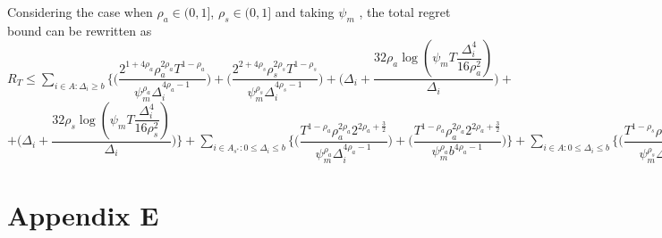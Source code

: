 \begin{remark}
\label{App:D:Rem:1}
Considering the case when $\rho_{a}\in (0,1]$, $\rho_{s}\in (0,1]$ and taking $\psi_{m}$ , the total regret bound can be rewritten as
\newline $R_{T}\leq \sum_{i\in A:\Delta_{i}\geq b} \bigg\lbrace \bigg(\dfrac{2^{1+4\rho_{a}}\rho_{a}^{2\rho_{a}}T^{1-\rho_{a}}}{\psi_{m}^{\rho_{a}}\Delta_{i}^{4\rho_{a}-1}}\bigg) + \bigg(\dfrac{2^{2+4\rho_{s}}\rho_{s}^{2\rho_{s}}T^{1-\rho_{s}}}{\psi_{m}^{\rho_{s}}\Delta_{i}^{4\rho_{s}-1}}\bigg) + \bigg(\Delta_{i}+\dfrac{32\rho_{a}\log{(\psi_{m}T\dfrac{\Delta_{i}^{4}}{16\rho_{a}^{2}})}}{\Delta_{i}}\bigg) +$ \newline $ + \bigg(\Delta_{i}+\dfrac{32\rho_{s}\log{(\psi_{m}T\dfrac{\Delta_{i}^{4}}{16\rho_{s}^{2}})}}{\Delta_{i}}\bigg)\bigg\rbrace + \sum_{i\in A_{s^{*}}:0\leq\Delta_{i}\leq b}\bigg\lbrace \bigg(\dfrac{T^{1-\rho_{a}}\rho_{a}^{2\rho_{a}}2^{2\rho_{a}+\frac{3}{2}}}{\psi_{m}^{\rho_{a}}\Delta_{i}^{4\rho_{a}-1}} \bigg)+\bigg(\dfrac{T^{1-\rho_{a}}\rho_{a}^{2\rho_{a}}2^{2\rho_{a}+\frac{3}{2}}}{\psi_{m}^{\rho_{a}}b^{4\rho_{a} -1}} \bigg)\bigg\rbrace + \sum_{i\in A:0\leq\Delta_{i}\leq b}\bigg\lbrace  \bigg(\dfrac{T^{1-\rho_{s}}\rho_{s}^{2\rho_{s}}2^{2\rho_{s}+3}}{\psi_{m}^{\rho_{s}}\Delta_{i}^{4\rho_{s}-1}} \bigg)+\bigg(\dfrac{T^{1-\rho_{s}}\rho_{s}^{2\rho_{s}}2^{2\rho_{s}+3}}{\psi_{m}^{\rho_{s}}b^{4\rho_{s} -1}} \bigg) \bigg\rbrace + max_{i:\Delta_{i}\leq b}\Delta_{i}T   $
\end{remark}


\section{Appendix E}

